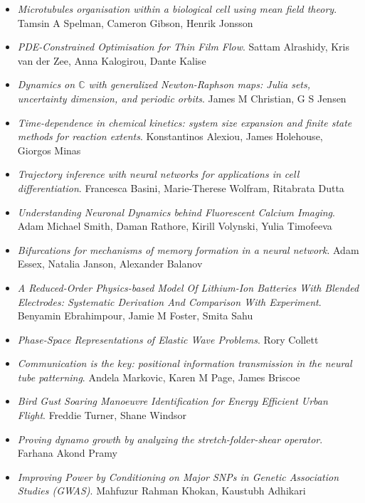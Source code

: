 \begin{itemize}
\item \textit{Microtubules organisation within a biological cell using mean field theory}.
Tamsin A Spelman, Cameron Gibson, Henrik Jonsson

\item \textit{PDE-Constrained Optimisation for Thin Film Flow}.
Sattam Alrashidy, Kris van der Zee, Anna Kalogirou, Dante Kalise

\item \textit{Dynamics on $\mathbb{C}$ with generalized Newton-Raphson maps: Julia sets, uncertainty dimension, and periodic orbits}.
James M Christian, G S Jensen

\item \textit{Time-dependence in chemical kinetics: system size expansion and finite state methods for reaction extents}.
Konstantinos Alexiou, James Holehouse, Giorgos Minas

\item \textit{Trajectory inference with neural networks for applications in cell differentiation}.
Francesca Basini, Marie-Therese Wolfram, Ritabrata Dutta

\item \textit{Understanding Neuronal Dynamics behind Fluorescent Calcium Imaging}.
Adam Michael Smith, Daman Rathore, Kirill Volynski, Yulia Timofeeva

\item \textit{Bifurcations for mechanisms of memory formation in a neural network}.
Adam Essex, Natalia Janson, Alexander Balanov

\item \textit{A Reduced-Order Physics-based Model Of Lithium-Ion Batteries With Blended Electrodes: Systematic Derivation And Comparison With Experiment}.
Benyamin Ebrahimpour, Jamie M Foster, Smita Sahu

\item \textit{Phase-Space Representations of Elastic Wave Problems}.
Rory Collett

\item \textit{Communication is the key: positional information transmission in the neural tube patterning}.
Andela Markovic, Karen M Page, James Briscoe

\item \textit{Bird Gust Soaring Manoeuvre Identification for Energy Efficient Urban Flight}.
Freddie Turner, Shane Windsor

\item \textit{Proving dynamo growth by analyzing the stretch-folder-shear operator}.
Farhana Akond Pramy

\item \textit{Improving Power by Conditioning on Major SNPs in Genetic Association Studies (GWAS)}.
Mahfuzur Rahman Khokan, Kaustubh Adhikari

\end{itemize}

